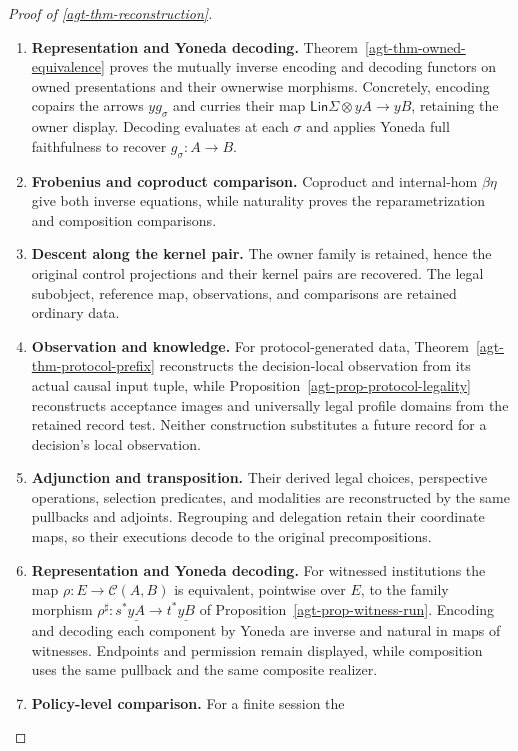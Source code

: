 \documentclass[11pt,a4paper]{article}
\numberwithin{equation}{section}
\theoremstyle{definition}
\theoremstyle{remark}
\theoremstyle{plain}
\providecommand{\Lin}{\mathsf{Lin}}
\providecommand{\cC}{\mathcal{C}}
\begin{document}
\begin{proof}[Proof of \cref{agt-thm-reconstruction}]
\leavevmode
\begin{enumerate}[label=\textup{(\arabic*)},leftmargin=*,itemsep=4pt,topsep=3pt]
  \item \textbf{Representation and Yoneda decoding.} Theorem~\ref{agt-thm-owned-equivalence} proves the mutually inverse
encoding and decoding functors on owned presentations and their ownerwise
morphisms. Concretely, encoding copairs the arrows $yg_\sigma$ and
curries their map $\Lin\Sigma\otimes yA\to yB$, retaining the owner
display. Decoding evaluates at each $\sigma$ and applies Yoneda full
faithfulness to recover $g_\sigma:A\to B$.
  \item \textbf{Frobenius and coproduct comparison.} Coproduct and internal-hom
$\beta\eta$ give both inverse equations, while naturality proves the
reparametrization and composition comparisons.
  \item \textbf{Descent along the kernel pair.} The owner family is retained, hence the original control projections and
their kernel pairs are recovered. The legal subobject, reference map,
observations, and comparisons are retained ordinary data.
  \item \textbf{Observation and knowledge.} For
protocol-generated data, Theorem~\ref{agt-thm-protocol-prefix} reconstructs
the decision-local observation from its actual causal input tuple, while
Proposition~\ref{agt-prop-protocol-legality} reconstructs acceptance
images and universally legal profile domains from the retained record
test. Neither construction substitutes a future record for a decision's
local observation.
  \item \textbf{Adjunction and transposition.} Their derived
legal choices, perspective operations, selection predicates, and modalities
are reconstructed by the same pullbacks and adjoints. Regrouping and
delegation retain their coordinate maps, so their executions decode to
the original precompositions.
  \item \textbf{Representation and Yoneda decoding.} For witnessed institutions the map $\rho:E\to\cC(A,B)$ is equivalent,
pointwise over $E$, to the family morphism
$\rho^\sharp:s^*\underline{yA}\to t^*\underline{yB}$ of
Proposition~\ref{agt-prop-witness-run}. Encoding and decoding each
component by Yoneda are inverse and natural in maps of witnesses. Endpoints and permission remain displayed, while composition uses the
same pullback and the same composite realizer.
  \item \textbf{Policy-level comparison.} For a finite session the

\end{enumerate}
\end{proof}
\end{document}
